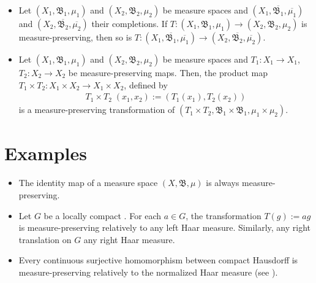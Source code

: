 \documentclass[12pt]{article}
\begin{document}
\begin{itemize}
\item Let $(X_1, \mathfrak{B}_1, \mu_1)$ and $(X_2, \mathfrak{B}_2, \mu_2)$ be measure spaces and $(X_1, \overline{\mathfrak{B}_1}, \overline{\mu_1})$ and $(X_2, \overline{\mathfrak{B}_2}, \overline{\mu_2})$ their completions. If $T:(X_1, \mathfrak{B}_1, \mu_1) \longrightarrow (X_2, \mathfrak{B}_2, \mu_2)$ is measure-preserving, then so is $T:(X_1, \overline{\mathfrak{B}_1}, \overline{\mu_1}) \longrightarrow (X_2, \overline{\mathfrak{B}_2}, \overline{\mu_2})$. 
\end{itemize}

\begin{itemize}
\item Let $(X_1, \mathfrak{B}_1, \mu_1)$ and $(X_2, \mathfrak{B}_2, \mu_2)$ be measure spaces and $T_1:X_1 \longrightarrow X_1$, $T_2:X_2 \longrightarrow X_2$ be measure-preserving maps. Then, the product map $T_1 \times T_2 : X_1 \times X_2 \longrightarrow X_1 \times X_2$, defined by
\begin{align*}
T_1 \times T_2 \;(x_1, x_2) := (T_1(x_1), T_2(x_2))
\end{align*}
is a measure-preserving transformation of $(T_1 \times T_2, \mathfrak{B}_1 \times \mathfrak{B}_1, \mu_1 \times \mu_2)$.
\end{itemize}


\section{Examples}

\begin{itemize}
\item The identity map of a measure space $(X, \mathfrak{B}, \mu)$ is always measure-preserving.
\end{itemize}
\begin{itemize}
\item Let $G$ be a locally compact . For each $a \in G$, the transformation $T(g):=ag$ is measure-preserving relatively to any left Haar measure. Similarly, any right translation on $G$  any right Haar measure.
\end{itemize}
\begin{itemize}
\item Every continuous surjective homomorphism between compact Hausdorff  is measure-preserving relatively to the normalized Haar measure (see ).
\end{itemize}
\end{document}
